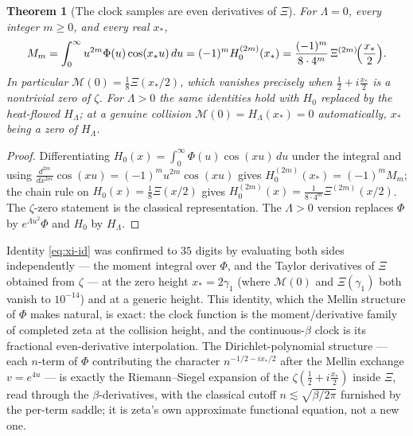 \documentclass[11pt,reqno]{amsart}
\theoremstyle{plain}
\newtheorem{theorem}{Theorem}[section]
\theoremstyle{definition}
\theoremstyle{remark}
\newcommand{\Mcal}{\mathcal M}
\begin{document}
\begin{theorem}[The clock samples are even derivatives of $\Xi$]
\label{thm:xi}
For $\Lambda=0$, every integer $m\ge0$, and every real $x_*$,
\begin{equation}\label{eq:xi-id}
  M_m=\int_0^\infty u^{2m}\Phi(u)\cos(x_*u)\,du
     =(-1)^m H_0^{(2m)}(x_*)
     =\frac{(-1)^m}{8\cdot4^m}\,\Xi^{(2m)}\!\Bigl(\frac{x_*}{2}\Bigr).
\end{equation}
In particular $\Mcal(0)=\tfrac18\Xi(x_*/2)$, which vanishes precisely when
$\tfrac12+i\tfrac{x_*}2$ is a nontrivial zero of $\zeta$. For $\Lambda>0$ the
same identities hold with $H_0$ replaced by the heat-flowed $H_\Lambda$; at
a genuine collision $\Mcal(0)=H_\Lambda(x_*)=0$ automatically, $x_*$ being a
zero of $H_\Lambda$.
\end{theorem}

\begin{proof}
Differentiating $H_0(x)=\int_0^\infty\Phi(u)\cos(xu)\,du$ under the integral
and using $\tfrac{d^{2m}}{dx^{2m}}\cos(xu)=(-1)^mu^{2m}\cos(xu)$ gives
$H_0^{(2m)}(x_*)=(-1)^mM_m$; the chain rule on $H_0(x)=\tfrac18\Xi(x/2)$ gives
$H_0^{(2m)}(x)=\tfrac1{8\cdot4^m}\Xi^{(2m)}(x/2)$. The $\zeta$-zero statement
is the classical representation. The $\Lambda>0$ version replaces $\Phi$ by
$e^{\Lambda u^2}\Phi$ and $H_0$ by $H_\Lambda$.
\end{proof}

Identity \eqref{eq:xi-id} was confirmed to $35$ digits by evaluating both
sides independently --- the moment integral over $\Phi$, and the Taylor
derivatives of $\Xi$ obtained from $\zeta$ --- at the zero height
$x_*=2\gamma_1$ (where $\Mcal(0)$ and $\Xi(\gamma_1)$ both vanish to
$10^{-14}$) and at a generic height. This identity, which the Mellin
structure of $\Phi$ makes natural, is exact: the clock function is the
moment/derivative family of completed zeta at the collision height, and the
continuous-$\beta$ clock is its fractional even-derivative interpolation. The Dirichlet-polynomial structure --- each
$n$-term of $\Phi$ contributing the character $n^{-1/2-ix_*/2}$ after the
Mellin exchange $v=e^{4u}$ --- is exactly the Riemann--Siegel expansion of
the $\zeta(\tfrac12+i\tfrac{x_*}2)$ inside $\Xi$, read through the
$\beta$-derivatives, with the classical cutoff $n\lesssim\sqrt{\beta/2\pi}$
furnished by the per-term saddle; it is zeta's own approximate functional
equation, not a new one.
\end{document}
